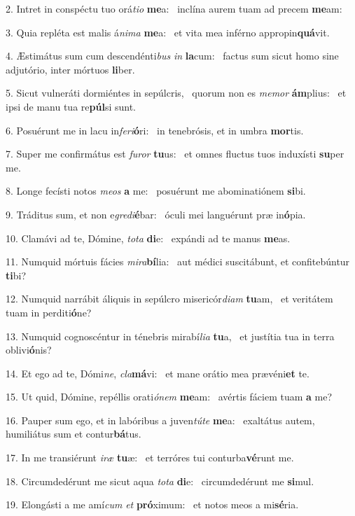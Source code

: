 2. Intret in conspéctu tuo orá\textit{ti}\textit{o} \textbf{me}a: \ast\  inclína aurem tuam ad precem \textbf{me}am:\

3. Quia repléta est malis á\textit{ni}\textit{ma} \textbf{me}a: \ast\  et vita mea inférno appropin\textbf{quá}vit.\

4. Æstimátus sum cum descendénti\textit{bus} \textit{in} \textbf{la}cum: \ast\  factus sum sicut homo sine adjutório, inter mórtuos \textbf{li}ber.\

5. Sicut vulneráti dormiéntes in sepúlcris, \dag\  quorum non es \textit{me}\textit{mor} \textbf{ám}plius: \ast\  et ipsi de manu tua re\textbf{púl}si sunt.\

6. Posuérunt me in lacu in\textit{fe}\textit{ri}\textbf{ó}ri: \ast\  in tenebrósis, et in umbra \textbf{mor}tis.\

7. Super me confirmátus est \textit{fu}\textit{ror} \textbf{tu}us: \ast\  et omnes fluctus tuos induxísti \textbf{su}per me.\

8. Longe fecísti notos \textit{me}\textit{os} \textbf{a} me: \ast\  posuérunt me abominatiónem \textbf{si}bi.\

9. Tráditus sum, et non e\textit{gre}\textit{di}\textbf{é}bar: \ast\  óculi mei languérunt præ in\textbf{ó}pia.\

10. Clamávi ad te, Dómine, \textit{to}\textit{ta} \textbf{di}e: \ast\  expándi ad te manus \textbf{me}as.\

11. Numquid mórtuis fácies \textit{mi}\textit{ra}\textbf{bí}lia: \ast\  aut médici suscitábunt, et confitebúntur \textbf{ti}bi?\

12. Numquid narrábit áliquis in sepúlcro misericór\textit{di}\textit{am} \textbf{tu}am, \ast\  et veritátem tuam in perditi\textbf{ó}ne?\

13. Numquid cognoscéntur in ténebris mirabí\textit{li}\textit{a} \textbf{tu}a, \ast\  et justítia tua in terra oblivi\textbf{ó}nis?\

14. Et ego ad te, Dómi\textit{ne}, \textit{cla}\textbf{má}vi: \ast\  et mane orátio mea prævéni\textbf{et} te.\

15. Ut quid, Dómine, repéllis orati\textit{ó}\textit{nem} \textbf{me}am: \ast\  avértis fáciem tuam \textbf{a} me?\

16. Pauper sum ego, et in labóribus a juven\textit{tú}\textit{te} \textbf{me}a: \ast\  exaltátus autem, humiliátus sum et contur\textbf{bá}tus.\

17. In me transiérunt \textit{i}\textit{ræ} \textbf{tu}æ: \ast\  et terróres tui conturba\textbf{vé}runt me.\

18. Circumdedérunt me sicut aqua \textit{to}\textit{ta} \textbf{di}e: \ast\  circumdedérunt me \textbf{si}mul.\

19. Elongásti a me amí\textit{cum} \textit{et} \textbf{pró}ximum: \ast\  et notos meos a mi\textbf{sé}ria.\

